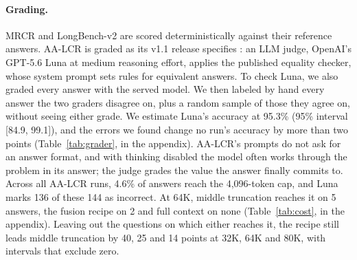 \documentclass[letterpaper]{article} %
\newcommand{\recipe}{fusion recipe}
\begin{document}
\paragraph{Grading.} MRCR and LongBench-v2 are scored deterministically against their reference answers. AA-LCR is graded as its v1.1 release specifies \cite{artificialanalysis2025aalcr,artificialanalysis2026methodology}: an LLM judge, OpenAI's GPT-5.6 Luna at medium reasoning effort, applies the published equality checker, whose system prompt sets rules for equivalent answers. To check Luna, we also graded every answer with the served model. We then labeled by hand every answer the two graders disagree on, plus a random sample of those they agree on, without seeing either grade. We estimate Luna's accuracy at 95.3\% (95\% interval [84.9, 99.1]), and the errors we found change no run's accuracy by more than two points (Table~\ref{tab:grader}, in the appendix). AA-LCR's prompts do not ask for an answer format, and with thinking disabled the model often works through the problem in its answer; the judge grades the value the answer finally commits to. Across all AA-LCR runs, 4.6\% of answers reach the 4,096-token cap, and Luna marks 136 of these 144 as incorrect. At 64K, middle truncation reaches it on 5 answers, the \recipe{} on 2 and full context on none (Table~\ref{tab:cost}, in the appendix). Leaving out the questions on which either reaches it, the recipe still leads middle truncation by 40, 25 and 14 points at 32K, 64K and 80K, with intervals that exclude zero.
\end{document}
